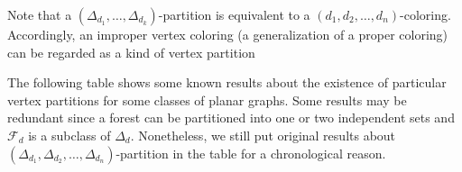 \documentclass[11pt]{amsart} %
\theoremstyle{definition}
\begin{document}
Note that a $(\Delta_{d_1},\ldots,\Delta_{d_k})$-partition is 
equivalent to a $(d_1,d_2,\dots, d_n)$-coloring. 
Accordingly, an improper vertex coloring 
(a generalization of a proper coloring) 
can be regarded as a kind of vertex partition 


	
 
The following table shows some known results about the existence of 
particular vertex partitions for some classes of planar graphs. 
Some results may be redundant since a forest  
can be partitioned into one or two independent sets 
and $\mathcal{F}_d$ is a subclass of $\Delta_d.$ 
Nonetheless, we still put original results about 
$(\Delta_{d_1}, \Delta_{d_2},\dots,  \Delta_{d_n})$-partition 
in the table for a chronological reason.
 
\end{document}
